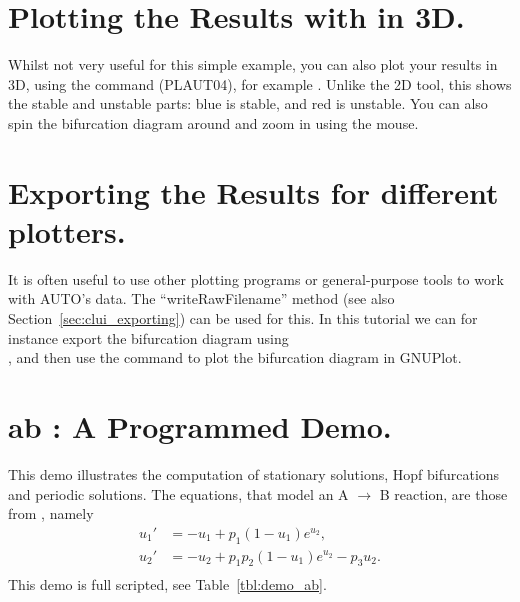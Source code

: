 \documentclass[12pt]{report}
\begin{document}
\section{ Plotting the Results with \AUTO in 3D.}
Whilst not very useful for this simple example, you can also plot
your results in 3D, using the  command (PLAUT04), for example
. Unlike the 2D tool, this shows the stable and
unstable parts: blue is stable, and red is unstable. You can also
spin the bifurcation diagram around and zoom in using the mouse.

\section{ Exporting the Results for different plotters.}
It is often useful to use other plotting programs or general-purpose
tools to work with AUTO's data. The ``writeRawFilename'' method (see
also Section~\ref{sec:clui_exporting}) can be used for this.
In this tutorial we can for
instance export the bifurcation diagram using\\
, and then use
the command  to plot
the bifurcation diagram in GNUPlot.

\newpage
\section{ ab : A Programmed Demo.} \label{sec:Demos_ab}
This demo illustrates the computation of 
stationary solutions,
Hopf bifurcations 
and 
periodic solutions.
The equations, that model an A $\to$ B  reaction, are those from
 \citeyear{URP:74}, namely
\begin{equation} \begin{array}{cl}
  u_1 ' &=  -u_1 + p_1 (1-u_1) e^{u_2}, \\
  u_2 ' &=  -u_2 +  p_1 p_2 ( 1-u_1) e^{u_2} - p_3 u_2.\\
\end{array} \end{equation}
This demo is full scripted, see Table~\ref{tbl:demo_ab}.
\end{document}
